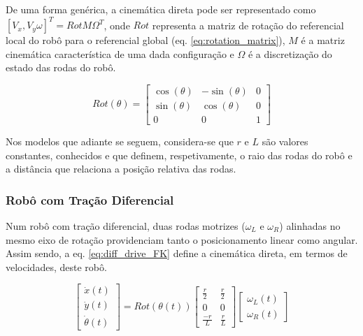 \documentclass[twocolumn]{article}
\begin{document}
De uma forma genérica, a cinemática direta pode ser representado como $[V_x, V_y \omega]^T = Rot M \Omega^T$, onde $Rot$ representa a matriz de rotação do referencial local do robô para o referencial global (eq. \ref{eq:rotation_matrix}), $M$ é a matriz cinemática característica de uma dada configuração e $\Omega$ é a discretização do estado das rodas do robô.

\begin{equation}
    Rot(\theta) = \begin{bmatrix}
        \cos(\theta) & -\sin(\theta) & 0 \\
        \sin(\theta) & \cos(\theta) & 0 \\
        0 & 0 & 1
    \end{bmatrix}
    \label{eq:rotation_matrix}
\end{equation}

Nos modelos que adiante se seguem, considera-se que $r$ e $L$ são valores constantes, conhecidos e que definem, respetivamente, o raio das rodas do robô e a distância que relaciona a posição relativa das rodas.

\subsubsection{Robô com Tração Diferencial}

Num robô com tração diferencial, duas rodas motrizes ($\omega_L$ e $\omega_R$) alinhadas no mesmo eixo de rotação providenciam tanto o posicionamento linear como angular. Assim sendo, a eq. \ref{eq:diff_drive_FK} define a cinemática direta, em termos de velocidades, deste robô.

\begin{equation}
    \begin{bmatrix}
        \dot{x}(t) \\
        \dot{y}(t) \\
        \dot{\theta}(t) 
    \end{bmatrix} = 
    Rot(\theta(t))
    \begin{bmatrix}
        \frac{r}{2} & \frac{r}{2} \\
        0 & 0 \\
        \frac{-r}{L} & \frac{r}{L}
    \end{bmatrix}
    \begin{bmatrix}
        \omega_L(t) \\
        \omega_R(t)
    \end{bmatrix}
    \label{eq:diff_drive_FK}
\end{equation}
\end{document}

